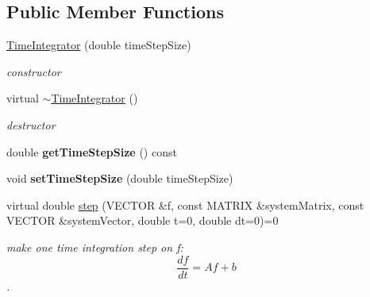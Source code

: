 \subsection*{Public Member Functions}
\begin{DoxyCompactItemize}
\item 
\hypertarget{classnatrium_1_1TimeIntegrator_a667fa724e41c57132c75562b5ce6fd56}{
\hyperlink{classnatrium_1_1TimeIntegrator_a667fa724e41c57132c75562b5ce6fd56}{TimeIntegrator} (double timeStepSize)}
\label{classnatrium_1_1TimeIntegrator_a667fa724e41c57132c75562b5ce6fd56}

\begin{DoxyCompactList}\small\item\em constructor \item\end{DoxyCompactList}\item 
\hypertarget{classnatrium_1_1TimeIntegrator_a8795d06c5322b72a5a2a1f30aa7a051d}{
virtual \hyperlink{classnatrium_1_1TimeIntegrator_a8795d06c5322b72a5a2a1f30aa7a051d}{$\sim$TimeIntegrator} ()}
\label{classnatrium_1_1TimeIntegrator_a8795d06c5322b72a5a2a1f30aa7a051d}

\begin{DoxyCompactList}\small\item\em destructor \item\end{DoxyCompactList}\item 
\hypertarget{classnatrium_1_1TimeIntegrator_a6e763133e114cdd758307ca30b65f161}{
double {\bfseries getTimeStepSize} () const }
\label{classnatrium_1_1TimeIntegrator_a6e763133e114cdd758307ca30b65f161}

\item 
\hypertarget{classnatrium_1_1TimeIntegrator_a18592866e946c63ab1595d3ab688ea6b}{
void {\bfseries setTimeStepSize} (double timeStepSize)}
\label{classnatrium_1_1TimeIntegrator_a18592866e946c63ab1595d3ab688ea6b}

\item 
virtual double \hyperlink{classnatrium_1_1TimeIntegrator_a1c438e41d183d172d524aa5dc97785fb}{step} (VECTOR \&f, const MATRIX \&systemMatrix, const VECTOR \&systemVector, double t=0, double dt=0)=0
\begin{DoxyCompactList}\small\item\em make one time integration step on f: \[ \frac{df}{dt} = Af+b \]. \item\end{DoxyCompactList}\end{DoxyCompactItemize}


